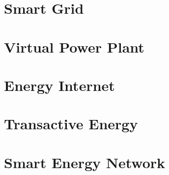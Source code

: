 
\section*{Smart Grid}


\section*{Virtual Power Plant}


\section*{Energy Internet}


\section*{Transactive Energy}


\section*{Smart Energy Network}


